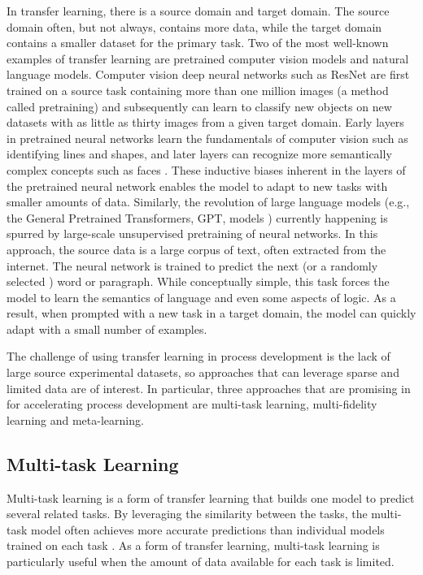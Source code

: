In transfer learning, there is a source domain and target domain. The source domain often, but not always, contains more data, while the target domain contains a smaller dataset for the primary task. Two of the most well-known examples of transfer learning are pretrained computer vision models and natural language models. Computer vision deep neural networks such as ResNet \cite{He2016} are first trained on a source task containing more than one million images (a method called pretraining) \cite{Russakovsky2015} and subsequently can learn to classify new objects on new datasets with as little as thirty images from a given target domain. Early layers in pretrained neural networks learn the fundamentals of computer vision such as identifying lines and shapes, and later layers can recognize more semantically complex concepts such as faces \cite{Zeiler2014}. These inductive biases inherent in the layers of the pretrained neural network enables the model to adapt to new tasks with smaller amounts of data.  Similarly, the revolution of large language models (e.g., the General Pretrained Transformers, GPT, models \cite{Radford2018, Brown2020}) currently happening is spurred by large-scale unsupervised pretraining of neural networks. In this approach, the source data is a large corpus of text, often extracted from the internet. The neural network is trained to predict the next (or a randomly selected \cite{Delvin2019}) word or paragraph. While conceptually simple, this task forces the model to learn the semantics of language and even some aspects of logic. As a result, when prompted with a new task in a target domain, the model can quickly adapt with a small number of examples.

The challenge of using transfer learning in process development is the lack of large source experimental datasets, so approaches that can leverage sparse and limited data are of interest. In particular, three approaches that are promising in for accelerating process development are multi-task learning, multi-fidelity learning and meta-learning.

\subsection{Multi-task Learning}

Multi-task learning is a form of transfer learning that builds one model to predict several related tasks. By leveraging the similarity between the tasks, the multi-task model often achieves more accurate predictions than individual models trained on each task \cite{Simes2018}. As a form of transfer learning, multi-task learning is particularly useful when the amount of data available for each task is limited.

